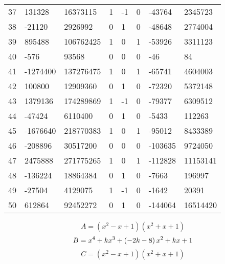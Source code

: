 \documentclass{amsart}
\begin{document}
\begin{longtable}{|l|l|l|lllll|}
37&131328&16373115&1&-1&0&-43764&2345723\\
38&-21120&2926992&0&1&0&-48648&2774004\\
39&895488&106762425&1&0&1&-53926&3311123\\
40&-576&93568&0&0&0&-46&84\\
41&-1274400&137276475&1&0&1&-65741&4604003\\
42&100800&12909360&0&1&0&-72320&5372148\\
43&1379136&174289869&1&-1&0&-79377&6309512\\
44&-47424&6110400&0&1&0&-5433&112263\\
45&-1676640&218770383&1&0&1&-95012&8433389\\
46&-208896&30517200&0&0&0&-103635&9724050\\
47&2475888&271775265&1&0&1&-112828&11153141\\
48&-136224&18864384&0&1&0&-7663&196997\\
49&-27504&4129075&1&-1&0&-1642&20391\\
50&612864&92452272&0&1&0&-144064&16514420\\
\hline
\end{longtable}
$$A=(x^2
 - x
 + 1)(x^2
 + x
 + 1)$$
$$B=x^4
 + k\*x^3
 + \left(-2\*k
 - 8\right) \*x^2
 + k\*x
 + 1$$
$$C=(x^2
 - x
 + 1)(x^2
 + x
 + 1)$$
\end{document}
